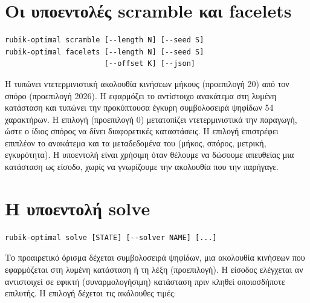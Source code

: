 \section{Οι υποεντολές scramble και facelets}
\label{sec:cli-scramble}

\begin{verbatim}
rubik-optimal scramble [--length N] [--seed S]
rubik-optimal facelets [--length N] [--seed S]
                       [--offset K] [--json]
\end{verbatim}

Η  τυπώνει ντετερμινιστική ακολουθία κινήσεων μήκους  (προεπιλογή 20) από τον σπόρο  (προεπιλογή 2026). Η  εφαρμόζει το αντίστοιχο ανακάτεμα στη λυμένη κατάσταση και τυπώνει την προκύπτουσα έγκυρη συμβολοσειρά ψηφίδων 54 χαρακτήρων. Η επιλογή  (προεπιλογή 0) μετατοπίζει ντετερμινιστικά την παραγωγή, ώστε ο ίδιος σπόρος να δίνει διαφορετικές καταστάσεις. Η επιλογή  επιστρέφει επιπλέον το ανακάτεμα και τα μεταδεδομένα του (μήκος, σπόρος, μετρική, εγκυρότητα). Η υποεντολή είναι χρήσιμη όταν θέλουμε να δώσουμε απευθείας μια κατάσταση ως είσοδο, χωρίς να γνωρίζουμε την ακολουθία που την παρήγαγε.

\section{Η υποεντολή solve}
\label{sec:cli-solve}

\begin{verbatim}
rubik-optimal solve [STATE] [--solver NAME] [...]
\end{verbatim}

Το προαιρετικό όρισμα  δέχεται συμβολοσειρά ψηφίδων, μια ακολουθία κινήσεων που εφαρμόζεται στη λυμένη κατάσταση ή τη λέξη  (προεπιλογή). Η είσοδος ελέγχεται αν αντιστοιχεί σε εφικτή (συναρμολογήσιμη) κατάσταση πριν κληθεί οποιοσδήποτε επιλυτής. Η επιλογή  δέχεται τις ακόλουθες τιμές:

